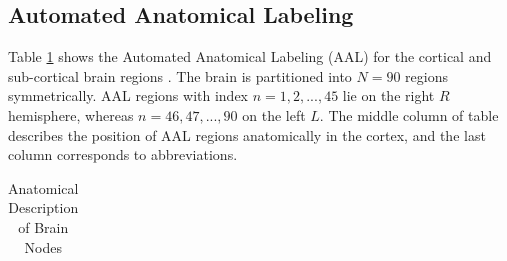 \documentclass[fleqn,10pt]{wlpeerj}
\begin{document}
\subsection*{Automated Anatomical Labeling}

Table \ref{tab:AAL} shows the Automated Anatomical Labeling (AAL) for the cortical and sub-cortical brain regions \citep{TZO02}. The brain is partitioned into $N=90$ regions symmetrically. AAL regions with index $n={1,2,...,45}$ lie on the right $R$ hemisphere, whereas $n={46,47,...,90}$ on the left $L$. The middle column of table describes the position of AAL regions anatomically in the cortex, and the last column corresponds to abbreviations.

\begin{table}[htbp] 
\centering
\caption[Automated Anatomical Labeling for the Brain Regions]{\label{tab:AAL}Anatomical Description of Brain Nodes }

\begin{tabular}{l | l | c}


\end{tabular}
\end{table}
\end{document}
